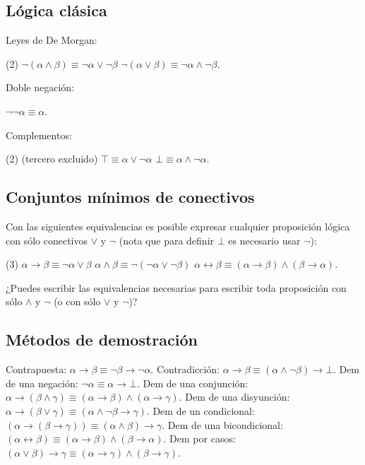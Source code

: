 \documentclass[letterpaper,DIV=12,headsepline,12pt]{scrartcl}
\begin{document}
\subsection{Lógica clásica}
Leyes de De Morgan:
\begin{tasks}(2)
  \task \(\neg(\alpha\land\beta)\equiv\neg\alpha\lor\neg\beta\)
  \task \(\neg(\alpha\lor\beta)\equiv\neg\alpha\land\neg\beta\).
\end{tasks}
%
Doble negación:
\begin{tasks}
  \task \(\neg\neg\alpha\equiv\alpha\).
\end{tasks}
%
Complementos:
\begin{tasks}(2)
  \task (tercero excluido) \(\top\equiv\alpha\lor\neg\alpha\)
  \task \(\bot\equiv\alpha\land\neg\alpha\).
\end{tasks}

\subsection{Conjuntos mínimos de conectivos}
Con las siguientes equivalencias es posible expresar cualquier proposición
lógica con sólo conectivos \(\lor\) y \(\neg\) (nota que para definir \(\bot\)
es necesario usar \(\neg\)):
\begin{tasks}(3)
  \task \(\alpha\to\beta\equiv\neg\alpha\lor\beta\)
  \task \(\alpha\land\beta\equiv\neg(\neg\alpha\lor\neg\beta)\)
  \task* \(\alpha\leftrightarrow\beta\equiv(\alpha\to\beta)\land(\beta\to\alpha)\).
\end{tasks}
¿Puedes escribir las equivalencias necesarias para escribir toda proposición con
sólo \(\land\) y \(\neg\) (o con sólo \(\lor\) y \(\neg\))?

\subsection{Métodos de demostración}
\begin{tasks}
  \task Contrapuesta: \(\alpha\to\beta\equiv\neg\beta\to\neg\alpha\).
  \task Contradicción: \(\alpha\to\beta\equiv(\alpha\land\neg\beta)\to\bot\).
  \task Dem de una negación: \(\neg\alpha\equiv\alpha\to\bot\).
  \task Dem de una conjunción: 
  \(\alpha\to(\beta\land\gamma)\equiv(\alpha\to\beta)\land(\alpha\to\gamma)\).
  \task Dem de una disyunción:
  \(\alpha\to(\beta\lor\gamma)\equiv(\alpha\land\neg\beta\to\gamma)\).
  \task Dem de un condicional:
  \((\alpha\to(\beta\to\gamma))\equiv(\alpha\land\beta)\to\gamma\).
  \task Dem de una bicondicional:
  \((\alpha\leftrightarrow\beta)\equiv(\alpha\to\beta)\land(\beta\to\alpha)\).
  \task Dem por casos:
  \((\alpha\lor\beta)\to\gamma\equiv(\alpha\to\gamma)\land(\beta\to\gamma)\).
\end{tasks}
\end{document}

